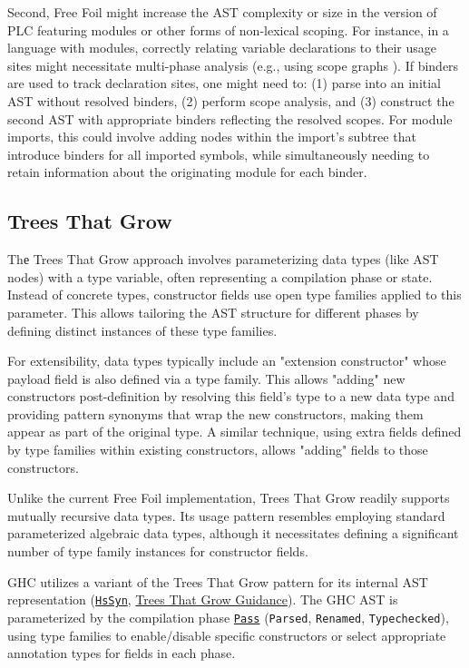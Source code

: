 Second, Free Foil might increase the AST complexity or size in the version of PLC featuring modules or other forms of non-lexical scoping. For instance, in a language with modules, correctly relating variable declarations to their usage sites might necessitate multi-phase analysis (e.g., using scope graphs \cite{poulsen-monadic-2023}). If binders are used to track declaration sites, one might need to: (1) parse into an initial AST without resolved binders, (2) perform scope analysis, and (3) construct the second AST with appropriate binders reflecting the resolved scopes. For module imports, this could involve adding nodes within the import's subtree that introduce binders for all imported symbols, while simultaneously needing to retain information about the originating module for each binder.

\subsection{Trees That Grow}
\label{chap:LiteratureReview:sec:AstRepresentations:TreesThatGrow}

Thе Trees That Grow approach involves parameterizing data types (like AST nodes) with a type variable, often representing a compilation phase or state. Instead of concrete types, constructor fields use open type families applied to this parameter. This allows tailoring the AST structure for different phases by defining distinct instances of these type families.

For extensibility, data types typically include an "extension constructor" whose payload field is also defined via a type family. This allows "adding" new constructors post-definition by resolving this field's type to a new data type and providing pattern synonyms that wrap the new constructors, making them appear as part of the original type. A similar technique, using extra fields defined by type families within existing constructors, allows "adding" fields to those constructors.

Unlike the current Free Foil implementation, Trees That Grow readily supports mutually recursive data types. Its usage pattern resembles employing standard parameterized algebraic data types, although it necessitates defining a significant number of type family instances for constructor fields.

GHC utilizes a variant of the Trees That Grow pattern \cite{trees-that-grow-2016} for its internal AST representation (\href{https://gitlab.haskell.org/ghc/ghc/-/wikis/implementing-trees-that-grow/hs-syn}{\texttt{HsSyn}}, \href{https://gitlab.haskell.org/ghc/ghc/-/wikis/implementing-trees-that-grow/trees-that-grow-guidance}{Trees That Grow Guidance}). The GHC AST is parameterized by the compilation phase \href{https://github.com/ghc/ghc/blob/ed38c09bd89307a7d3f219e1965a0d9743d0ca73/compiler/GHC/Hs/Extension.hs#L169}{\texttt{Pass}} (\texttt{Parsed}, \texttt{Renamed}, \texttt{Typechecked}), using type families to enable/disable specific constructors or select appropriate annotation types for fields in each phase.

